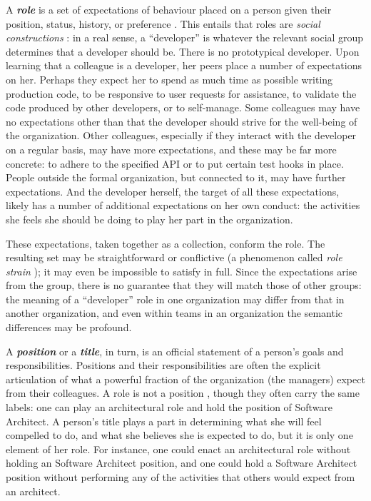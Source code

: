 \documentclass[10pt, conference, compsocconf]{IEEEtran}
\begin{document}
A \textbf{\emph{role}} is a set of expectations of behaviour placed on a person given their position, status, history, or preference \cite{Turner1956,Gordon1976,Rizzo1970}. This entails that roles are \emph{social constructions} \cite{Berger1967}: in a real sense, a ``developer'' is whatever the relevant social group determines that a developer should be. There is no prototypical developer. Upon learning that a colleague is a developer, her peers place a number of expectations on her. Perhaps they expect her to spend as much time as possible writing production code, to be responsive to user requests for assistance, to validate the code produced by other developers, or to self-manage. Some colleagues may have no expectations other than that the developer should strive for the well-being of the organization. Other colleagues, especially if they interact with the developer on a regular basis, may have more expectations, and these may be far more concrete: to adhere to the specified API or to put certain test hooks in place. People outside the formal organization, but connected to it, may have further expectations. And the developer herself, the target of all these expectations, likely has a number of additional expectations on her own conduct: the activities she feels she should be doing to play her part in the organization.

These expectations, taken together as a collection, conform the role. The resulting set may be straightforward or conflictive (a phenomenon called \emph{role strain} \cite{Goode1960}); it may even be impossible to satisfy in full. Since the expectations arise from the group, there is no guarantee that they will match those of other groups: the meaning of a ``developer'' role in one organization may differ from that in another organization, and even within teams in an organization the semantic differences may be profound.

A \textbf{\emph{position}} or a \textbf{\emph{title}}, in turn, is an official statement of a person's goals and responsibilities. Positions and their responsibilities are often the explicit articulation of what a powerful fraction of the organization (the managers) expect from their colleagues. A role is not a position \cite{Turner1956}, though they often carry the same labels: one can play an architectural role and hold the position of Software Architect. A person's title plays a part in determining what she will feel compelled to do, and what she believes she is expected to do, but it is only one element of her role. For instance, one could enact an architectural role without holding an Software Architect position, and one could hold a Software Architect position without performing any of the activities that others would expect from an architect.
\end{document}
